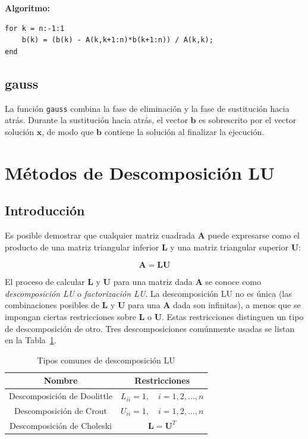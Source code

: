 \documentclass[12pt,letterpaper]{article}
\theoremstyle{definition}
\theoremstyle{plain}
\theoremstyle{remark}
\begin{document}
\textbf{Algoritmo:}

\begin{verbatim}
for k = n:-1:1
    b(k) = (b(k) - A(k,k+1:n)*b(k+1:n)) / A(k,k);
end
\end{verbatim}

\subsection{gauss}
La función \texttt{gauss} combina la fase de eliminación y la fase de sustitución hacia atrás. Durante la sustitución hacia atrás, el vector $\mathbf{b}$ es sobrescrito por el vector solución $\mathbf{x}$, de modo que $\mathbf{b}$ contiene la solución al finalizar la ejecución.



\section{Métodos de Descomposición LU}

\subsection*{Introducción}

Es posible demostrar que cualquier matriz cuadrada $\mathbf{A}$ puede expresarse como el producto de una matriz triangular inferior $\mathbf{L}$ y una matriz triangular superior $\mathbf{U}$:

\[
\mathbf{A} = \mathbf{LU}
\tag{1.6}
\]

El proceso de calcular $\mathbf{L}$ y $\mathbf{U}$ para una matriz dada $\mathbf{A}$ se conoce como \textit{descomposición LU} o \textit{factorización LU}. La descomposición LU no es única (las combinaciones posibles de $\mathbf{L}$ y $\mathbf{U}$ para una $\mathbf{A}$ dada son infinitas), a menos que se impongan ciertas restricciones sobre $\mathbf{L}$ o $\mathbf{U}$. Estas restricciones distinguen un tipo de descomposición de otro. Tres descomposiciones comúnmente usadas se listan en la Tabla~\ref{tab:lu}.

\begin{table}[h!]
\centering
\begin{tabular}{|c|c|}
\hline
\textbf{Nombre} & \textbf{Restricciones} \\
\hline
Descomposición de Doolittle & $L_{ii} = 1, \quad i = 1, 2, \ldots, n$ \\
Descomposición de Crout & $U_{ii} = 1, \quad i = 1, 2, \ldots, n$ \\
Descomposición de Choleski & $\mathbf{L} = \mathbf{U}^T$ \\
\hline
\end{tabular}
\caption{Tipos comunes de descomposición LU}
\label{tab:lu}
\end{table}
\end{document}
